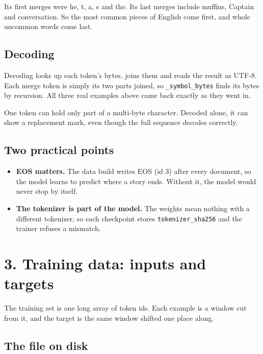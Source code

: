 \documentclass[11pt,a4paper]{article}
\newcommand{\vs}{\textvisiblespace}
\newcommand{\code}[1]{\texttt{#1}}
\begin{document}
Its first merges were he, \vs{}t, \vs{}a, \vs{}s and \vs{}the. Its last merges include \vs{}muffins, \vs{}Captain and \vs{}conversation. So the most common pieces of English come first, and whole uncommon words come last.

\subsection*{Decoding}
{}

Decoding looks up each token's bytes, joins them and reads the result as UTF-8. Each merge token is simply its two parts joined, so \code{\_\allowbreak{}symbol\_\allowbreak{}bytes} finds its bytes by recursion. All three real examples above came back exactly as they went in.

One token can hold only part of a multi-byte character. Decoded alone, it can show a replacement mark, even though the full sequence decodes correctly.

\subsection*{Two practical points}
{}

\begin{itemize}
\item \textbf{EOS matters.} The data build writes EOS (id 3) after every document, so the model learns to predict where a story ends. Without it, the model would never stop by itself.
\item \textbf{The tokenizer is part of the model.} The weights mean nothing with a different tokenizer, so each checkpoint stores \code{tokenizer\_\allowbreak{}sha256} and the trainer refuses a mismatch.
\end{itemize}

\section*{3. Training data: inputs and targets}
{}

The training set is one long array of token ids. Each example is a window cut from it, and the target is the same window shifted one place along.

\subsection*{The file on disk}
{}
\end{document}
